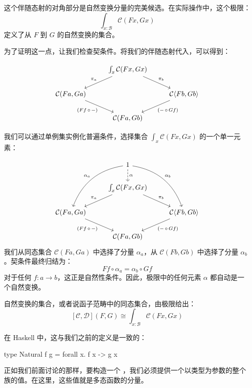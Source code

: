 \documentclass[DaoFP]{subfiles}
\begin{document}
 这个伴随态射的对角部分是自然变换分量的完美候选。在实际操作中，这个极限：
 \[  \int_{x \colon  \mathcal{B}} \mathcal{C}(F x, G x) \]
 定义了从 $F$ 到 $G$ 的自然变换的集合。

 为了证明这一点，让我们检查契条件。将我们的伴随态射代入，可以得到：

 \[
  \begin{tikzcd}
   & \int_{x} \mathcal{C}(F x, G x)
   \arrow[ld, "\pi_a"']
   \arrow[rd, "\pi_b"]
   \\
   \mathcal{C} ( F a, G a )
   \arrow[dr, "{(Ff \, \circ \, -)}"']
   && \mathcal{C} \langle F b, G b \rangle
   \arrow[dl, "{(- \, \circ\, Gf)}"]
   \\
   &  \mathcal{C} ( F a, G b )
  \end{tikzcd}
 \]

 我们可以通过单例集实例化普遍条件，选择集合 $\int_{x} \mathcal{C}(F x, G x)$ 的一个单一元素：

 \[
  \begin{tikzcd}
   & 1
   \arrow[d, dashed, "\alpha"]
   \arrow[ddl, bend right, "\alpha_a"']
   \arrow[ddr, bend left, "\alpha_b"]
   \\
   & \int_{x} \mathcal{C}(F x, G x)
   \arrow[ld, "\pi_a"']
   \arrow[rd, "\pi_b"]
   \\
   \mathcal{C} ( F a, G a )
   \arrow[dr, "{(F f \, \circ \, -)}"']
   && \mathcal{C} \langle F b, G b \rangle
   \arrow[dl, "{(- \, \circ\, G f)}"]
   \\
   &  \mathcal{C} ( F a, G b )
  \end{tikzcd}
 \]
 我们从同态集合 $\mathcal{C} ( F a, G a )$ 中选择了分量 $\alpha_a$，从 $\mathcal{C} ( F b, G b )$ 中选择了分量 $\alpha_b$。契条件最终归结为：
 \[ F f \circ \alpha_a = \alpha_b \circ G f \]
 对于任何 $f \colon a \to b$，这正是自然性条件。因此，极限中的任何元素 $\alpha$ 都自动是一个自然变换。

 自然变换的集合，或者说函子范畴中的同态集合，由极限给出：
 \[ [\mathcal{C}, \mathcal{D}] (F, G) \cong \int_{x \colon  \mathcal{B}} \mathcal{C}(F x, G x)\]

 在 Haskell 中，这与我们之前的定义是一致的：
 \begin{haskell}
  type Natural f g = forall x. f x -> g x
 \end{haskell}

 正如我们前面讨论的那样，要构造一个 ，我们必须提供一个以类型为参数的整个族的值。在这里，这些值就是多态函数的分量。
\end{document}
